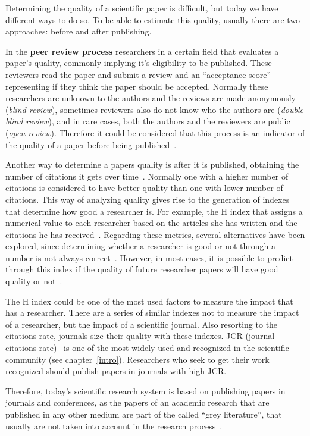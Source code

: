 Determining the quality of a scientific paper is difficult, but today we have
different ways to do so. To be able to estimate this quality, usually there are
two approaches: before and after publishing.

In the \textbf{peer review process} researchers in a certain field that
evaluates a paper's quality, commonly implying it's eligibility to be published.
These reviewers read the paper and submit a review and an ``acceptance score''
representing if they think the paper should be accepted. Normally these
researchers are unknown to the authors and the reviews are made anonymously
(\emph{blind review}), sometimes reviewers also do not know who the authors are
(\emph{double blind review}), and in rare cases, both the authors and the
reviewers are public (\emph{open review}). Therefore it could be considered that
this process is an indicator of the quality of a paper before being
published~\cite{szklo2006quality}.

Another way to determine a papers quality is after it is published, obtaining
the number of citations it gets over time~\cite{redner1998popular}. Normally one
with a higher number of citations is considered to have better quality than one
with lower number of citations. This way of analyzing quality gives rise to the
generation of indexes that determine how good a researcher is. For example, the
H index that assigns a numerical value to each researcher based on the articles
she has written and the citations he has received~\cite{bornmann2007we}.
Regarding these metrics, several alternatives have been explored, since
determining whether a researcher is good or not through a number is not always
correct~\cite{bornmann2008there}. However, in most cases, it is possible to
predict through this index if the quality of future researcher papers will have
good quality or not~\cite{hirsch2007does}.

The H index could be one of the most used factors to measure the impact that has
a researcher. There are a series of similar indexes not to measure the impact of
a researcher, but the impact of a scientific journal. Also resorting to the
citations rate, journals size their quality with these indexes. JCR (journal
citations rate)~\cite{doi:10.1001/jama.295.1.90} is one of the most widely used
and recognized in the scientific community (see chapter~\ref{intro}).
Researchers who seek to get their work recognized should publish papers in
journals with high JCR.

Therefore, today's scientific research system is based on publishing papers in
journals and conferences, as the papers of an academic research that are
published in any other medium are part of the called ``grey literature'', that
usually are not taken into account in the research
process~\cite{rothstein2009grey}.

